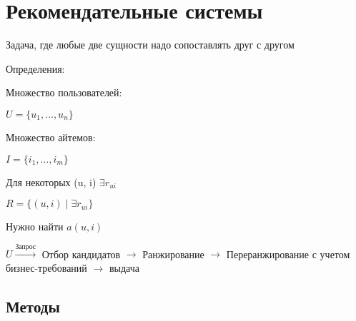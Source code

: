 \documentclass[a4paper, 12pt]{article}
\begin{document}
\section{Рекомендательные системы}

Задача, где любые две сущности надо сопоставлять друг с другом

Определения:

Множество пользователей:

$U = \{u_1, \ldots, u_n\}$

Множество айтемов:

$I = \{i_1, \dots, i_m\}$

Для некоторых (u, i) $\exists r_{ui}$

$R = \{(u, i) \mid \exists r_{ui}\}$

Нужно найти $a(u, i)$

$U \xrightarrow{\textrm{Запрос}}$ Отбор кандидатов 
$\rightarrow$ Ранжирование $\rightarrow$ Переранжирование с
учетом бизнес-требований $\rightarrow$ выдача

\subsection{Методы}
\end{document}
